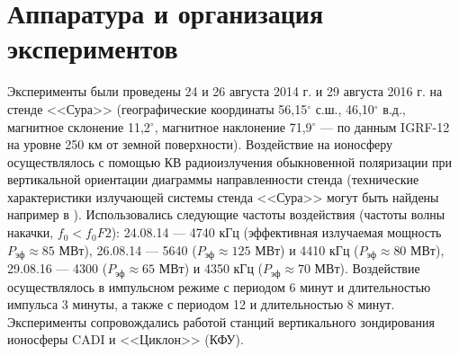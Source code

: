 \documentclass[12pt,a4paper]{article}
\begin{document}
\section{Аппаратура и организация экспериментов} \label{sec:exp_setup}
Эксперименты были проведены 24 и 26 августа 2014 г. и 29 августа 2016 г. на стенде <<Сура>> (географические координаты 56,15$^{\circ}$ с.ш., 46,10$^{\circ}$ в.д., магнитное склонение 11,2$^{\circ}$, магнитное наклонение 71,9$^{\circ}$ --- по данным IGRF-12 \cite{Thebault2015} на уровне 250 км от земной поверхности). Воздействие на ионосферу осуществлялось с помощью КВ радиоизлучения обыкновенной поляризации при вертикальной ориентации диаграммы направленности стенда (технические характеристики излучающей системы стенда <<Сура>> могут быть найдены например в \cite{BERNHARDTSCALESGRACHEtAl1991}). Использовались следующие частоты воздействия (частоты волны накачки, $f_0<f_{0}F2$): 24.08.14 --- 4740 кГц (эффективная излучаемая мощность $P_{\text{эф}} \approx 85$ МВт), 26.08.14 --- 5640 ($P_{\text{эф}} \approx 125$ МВт) и 4410 кГц ($P_{\text{эф}} \approx 80$ МВт), 29.08.16 --- 4300 ($P_{\text{эф}} \approx 65$ МВт) и 4350 кГц ($P_{\text{эф}} \approx 70$ МВт). Воздействие осуществлялось в импульсном режиме с периодом 6 минут и длительностью импульса 3 минуты, а также с периодом 12 и длительностью 8 минут. Эксперименты сопровождались работой станций вертикального зондирования ионосферы CADI \cite{CADI_specs} и <<Циклон>> (КФУ).
\end{document}
